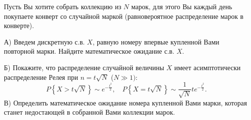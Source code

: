 \begin{problem}
Пусть Вы хотите собрать коллекцию из $N$ 
марок, для этого Вы каждый день покупаете конверт со случайной маркой 
(равновероятное распределение марок в конверте).

А) Введем дискретную с.в. $X$, равную номеру впервые купленной Вами 
повторной марки. Найдите математическое ожидание с.в. $X$.

Б) Покажите, что распределение случайной величины $X$ имеет асимптотически 
распределение Релея при $n=t\sqrt N $ ($N\gg 1)$:
\[
P\left\{ {X>t\sqrt N } \right\}\sim e^{-\frac{t^2}{2}},
\quad
P\left\{ {X=t\sqrt N } \right\}\sim \frac{1}{\sqrt N }te^{-\frac{t^2}{2}}.
\]
В) Определить математическое ожидание номера купленной Вами марки, которая 
станет недостающей в собранной Вами коллекции марок. 

\end{problem}

